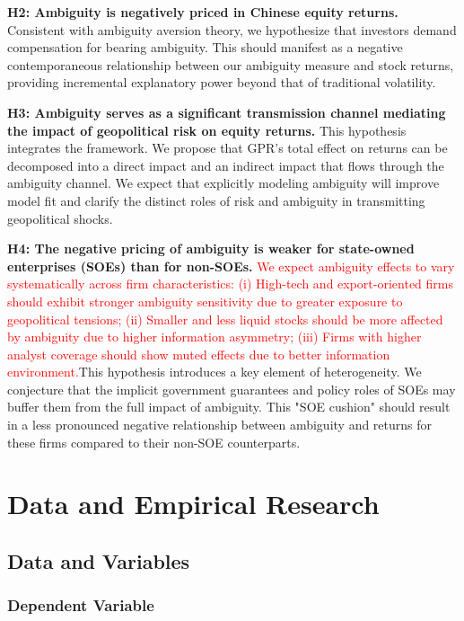 \documentclass[preprint,12pt,authoryear]{elsarticle}
\begin{document}
\textbf{H2: Ambiguity is negatively priced in Chinese equity returns.}
Consistent with ambiguity aversion theory, we hypothesize that investors demand compensation for bearing ambiguity. This should manifest as a negative contemporaneous relationship between our ambiguity measure and stock returns, providing incremental explanatory power beyond that of traditional volatility.

\textbf{H3: Ambiguity serves as a significant transmission channel mediating the impact of geopolitical risk on equity returns.}
This hypothesis integrates the framework. We propose that GPR's total effect on returns can be decomposed into a direct impact and an indirect impact that flows through the ambiguity channel. We expect that explicitly modeling ambiguity will improve model fit and clarify the distinct roles of risk and ambiguity in transmitting geopolitical shocks.

\textbf{H4: The negative pricing of ambiguity is weaker for state-owned enterprises (SOEs) than for non-SOEs.}
\textcolor{red}{We expect ambiguity effects to vary systematically across firm characteristics: (i) High-tech and export-oriented firms should exhibit stronger ambiguity sensitivity due to greater exposure to geopolitical tensions; (ii) Smaller and less liquid stocks should be more affected by ambiguity due to higher information asymmetry; (iii) Firms with higher analyst coverage should show muted effects due to better information environment.}This hypothesis introduces a key element of heterogeneity. We conjecture that the implicit government guarantees and policy roles of SOEs may buffer them from the full impact of ambiguity. This "SOE cushion" should result in a less pronounced negative relationship between ambiguity and returns for these firms compared to their non-SOE counterparts.

\section{Data and Empirical Research}
\label{sec:data}

\subsection{Data and Variables}

\subsubsection{Dependent Variable}
\end{document}
